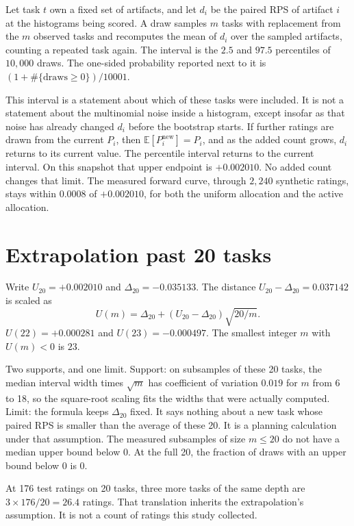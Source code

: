 \documentclass[11pt]{article}
\begin{document}
Let task $t$ own a fixed set of artifacts, and let $d_i$ be the paired RPS of artifact $i$ at the histograms being scored. A draw samples $m$ tasks with replacement from the $m$ observed tasks and recomputes the mean of $d_i$ over the sampled artifacts, counting a repeated task again. The interval is the $2.5$ and $97.5$ percentiles of $10{,}000$ draws. The one-sided probability reported next to it is $(1+\#\{\text{draws}\ge 0\})/10001$.

This interval is a statement about which of these tasks were included. It is not a statement about the multinomial noise inside a histogram, except insofar as that noise has already changed $d_i$ before the bootstrap starts. If further ratings are drawn from the current $P_i$, then $\mathbb{E}[P_i^{\text{new}}]=P_i$, and as the added count grows, $d_i$ returns to its current value. The percentile interval returns to the current interval. On this snapshot that upper endpoint is $+0.002010$. No added count changes that limit. The measured forward curve, through $2{,}240$ synthetic ratings, stays within $0.0008$ of $+0.002010$, for both the uniform allocation and the active allocation.

\section*{Extrapolation past 20 tasks}

Write $U_{20}=+0.002010$ and $\Delta_{20}=-0.035133$. The distance $U_{20}-\Delta_{20}=0.037142$ is scaled as
\begin{equation}
\boxed{U(m)=\Delta_{20}+(U_{20}-\Delta_{20})\sqrt{20/m}.}
\end{equation}
$U(22)=+0.000281$ and $U(23)=-0.000497$. The smallest integer $m$ with $U(m)<0$ is $23$.

Two supports, and one limit. Support: on subsamples of these 20 tasks, the median interval width times $\sqrt{m}$ has coefficient of variation $0.019$ for $m$ from 6 to 18, so the square-root scaling fits the widths that were actually computed. Limit: the formula keeps $\Delta_{20}$ fixed. It says nothing about a new task whose paired RPS is smaller than the average of these 20. It is a planning calculation under that assumption. The measured subsamples of size $m\le 20$ do not have a median upper bound below 0. At the full 20, the fraction of draws with an upper bound below 0 is 0.

At 176 test ratings on 20 tasks, three more tasks of the same depth are $3\times 176/20=26.4$ ratings. That translation inherits the extrapolation's assumption. It is not a count of ratings this study collected.
\end{document}
